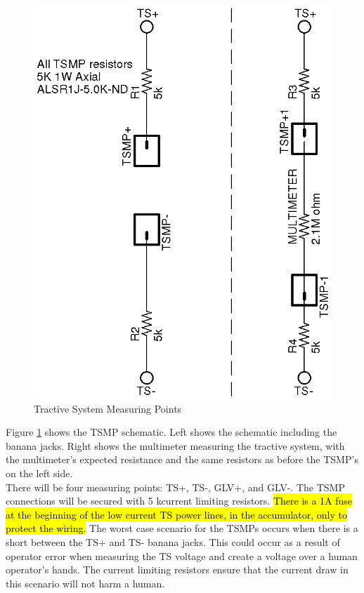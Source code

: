 \documentclass{article}
\DeclareRobustCommand{\hlr}[1]{{\sethlcolor{red}\hl{#1}}}
\begin{document}
            \begin{figure}[H]
                \centering
                \includegraphics{TSMP}
                \caption{Tractive System Measuring Points}
                \label{fig:TSMPschematic}
            \end{figure}

            Figure \ref{fig:TSMPschematic} shows the TSMP schematic. Left shows the schematic including the banana jacks. Right shows the multimeter measuring the tractive system, with the multimeter's expected resistance and the same resistors as before the TSMP's on the left side.\\

            There will be four measuring points: TS+, TS-, GLV+, and GLV-. The TSMP connections will be secured with 5 k\ohm current limiting resistors. \hlr{There is a 1A fuse at the beginning of the low current TS power lines, in the accumulator, only to protect the wiring.} The worst case scenario for the TSMPs occurs when there is a short between the TS+ and TS- banana jacks. This could occur as a result of operator error when measuring the TS  voltage and create a voltage over a human operator's hands. The current limiting resistors ensure that the current draw in this scenario will not harm a human.
\end{document}
